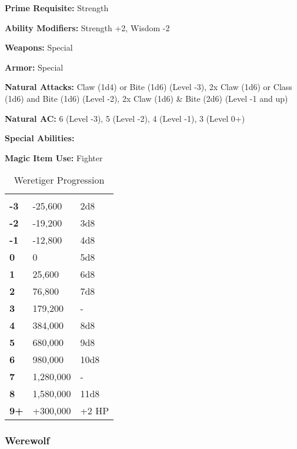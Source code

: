 \begin{multicols*}{2}
{\textbf{Prime Requisite:} Strength

\textbf{Ability Modifiers:} Strength +2, Wisdom -2

\textbf{Weapons:} Special

\textbf{Armor:} Special

\textbf{Natural Attacks:} Claw (1d4) or Bite (1d6) (Level -3), 2x Claw (1d6) or Class (1d6) and Bite (1d6) (Level -2), 2x Claw (1d6) \& Bite (2d6) (Level -1 and up)

\textbf{Natural AC:} 6 (Level -3), 5 (Level -2), 4 (Level -1), 3 (Level 0+)

\textbf{Special Abilities:} 

\textbf{Magic Item Use:} Fighter}

\begin {table}[H]
  \caption{Weretiger Progression}
  \begin{tabularx}{\columnwidth}{>{\bfseries}YYY}
   &  & \\
	-3 & -25,600 & 2d8\\
	-2 & -19,200 & 3d8\\
	-1 & -12,800 & 4d8\\
	0 & 0 & 5d8\\
	1 & 25,600 & 6d8\\
	2 & 76,800 & 7d8\\
	3 & 179,200 & -\\
	4 & 384,000 & 8d8\\
	5 & 680,000 & 9d8\\
	6 & 980,000 & 10d8\\
	7 & 1,280,000 & -\\
	8 & 1,580,000 & 11d8\\
	9+ & +300,000 & +2 HP
  \end {tabularx}
\end {table}

\subsubsection{Werewolf}
\end{multicols*}
